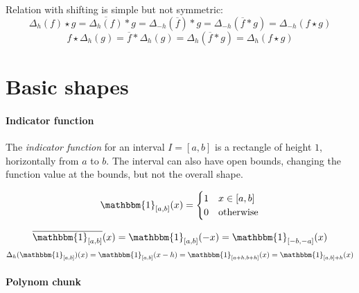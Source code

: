 \documentclass[a4paper,10pt]{article}
\newcommand\Shifted[2]{\Delta_{#1}(#2)}
\newcommand\Reversed[1]{\overline{#1}} %
\newcommand\Indicator[1]{\mathbbm{1}_{#1}}
\newcommand\Convolution{\ast}
\newcommand\Correlation{\star}
\newcommand\GridAxis[4]{%
    \draw[very thin,color=gray] (#1,#3) grid (#2,#4);
    \draw[->] (#1,0) -- (#2,0) node[right] {$x$};
    \draw[->] (0,#3) -- (0,#4);
    \node[below right] at (0,0) {$0$};
    \coordinate (Origin) at (0,0);
    \coordinate (FuncStart) at (#1,0);
    \coordinate (FuncEnd) at (#2,0);
}
\newcommand\SizedGridAxis[4]{%
    \GridAxis{#1}{#2}{#3}{#4}
    \node[below right] at (0,1) {$1$};
    \node[below right] at (1,0) {$1$};
}
\begin{document}
Relation with shifting is simple but not symmetric:
\[
    \Shifted{h}{f} \Correlation g = \Reversed{\Shifted{h}{f}} \Convolution g = \Shifted{-h}{\Reversed{f}} \Convolution g =
    \Shifted{-h}{\Reversed{f} \Convolution g} = \Shifted{-h}{f \Correlation g}
\]
\[ f \Correlation \Shifted{h}{g} = \Reversed{f} \Convolution \Shifted{h}{g} = \Shifted{h}{\Reversed{f} \Convolution g} = \Shifted{h}{f \Correlation g} \]

\section{Basic shapes}

\paragraph{Indicator function}

The \emph{indicator function} for an interval $I = [a,b]$ is a rectangle of height $1$, horizontally from $a$ to $b$.
The interval can also have open bounds, changing the function value at the bounds, but not the overall shape.
\begin{center}\end{center}
\[
    \Indicator{[a,b]}(x) = \begin{cases}
        1 & x \in \left[ a, b \right] \\
        0 & \text{otherwise}
    \end{cases}
\]

\[ \Reversed{\Indicator{[a,b]}}(x) = \Indicator{[a,b]}(-x) = \Indicator{[-b, -a]}(x) \]
\[ \Shifted{h}{\Indicator{[a,b]}}(x) = \Indicator{[a,b]}(x - h) = \Indicator{[a + h, b + h]}(x) = \Indicator{[a,b] + h}(x) \]

\paragraph{Polynom chunk}
\end{document}
